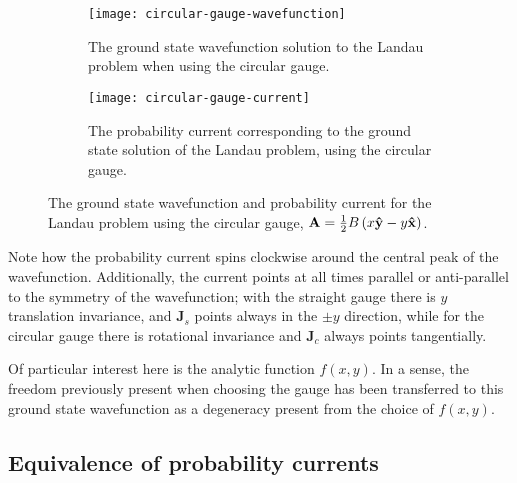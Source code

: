 \begin{figure}
    \centering
    \begin{subfigure}{0.45\linewidth}
        \centering
        \texttt{[image: circular-gauge-wavefunction]}
        \caption{The ground state wavefunction solution to the Landau problem when
            using the circular gauge.}
        \label{subfig:circular-wavefunction}
    \end{subfigure}
    \begin{subfigure}{0.45\linewidth}
        \centering
        \texttt{[image: circular-gauge-current]}
        \caption{The probability current corresponding to the ground state solution
            of the Landau problem, using the circular gauge.}
        \label{subfig:circular-current}
    \end{subfigure}
    \caption{The ground state wavefunction and probability current for the
        Landau problem using the circular gauge, $\mathbf{A} = \frac{1}{2} B
        \left( x\mathbf{\hat y } - y\mathbf{\hat x } \right)$.}
    \label{fig:circular}
\end{figure}

Note how the probability current spins clockwise around the central peak of the
wavefunction. Additionally, the current points at all times parallel or
anti-parallel to the symmetry of the wavefunction; with the straight gauge there
is $y$ translation invariance, and $\mathbf{J}_s$ points always in the $\pm y$
direction, while for the circular gauge there is rotational invariance and
$\mathbf{J}_c$ always points tangentially.

Of particular interest here is the analytic function $f(x,y)$. In a sense, the
freedom previously present when choosing the gauge has been transferred to this
ground state wavefunction as a degeneracy present from the choice of $f(x,y)$.

\subsection{Equivalence of probability currents}

